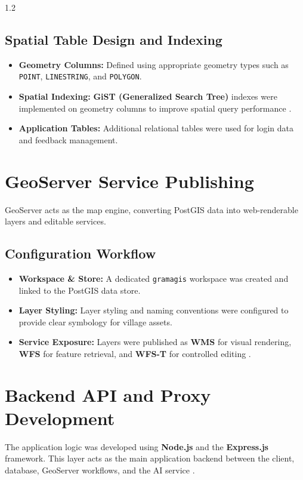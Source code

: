\begin{spacing}{1.2}
\subsection*{Spatial Table Design and Indexing}

\begin{itemize}
    \item \textbf{Geometry Columns:} Defined using appropriate geometry types such as \texttt{POINT}, \texttt{LINESTRING}, and \texttt{POLYGON}.
    \item \textbf{Spatial Indexing:} \textbf{GiST (Generalized Search Tree)} indexes were implemented on geometry columns to improve spatial query performance \cite{postgis_in_action}.
    \item \textbf{Application Tables:} Additional relational tables were used for login data and feedback management.
\end{itemize}

\section{GeoServer Service Publishing}

GeoServer acts as the map engine, converting PostGIS data into web-renderable layers and editable services.

\subsection*{Configuration Workflow}

\begin{itemize}
    \item \textbf{Workspace \& Store:} A dedicated \texttt{gramagis} workspace was created and linked to the PostGIS data store.
    \item \textbf{Layer Styling:} Layer styling and naming conventions were configured to provide clear symbology for village assets.
    \item \textbf{Service Exposure:} Layers were published as \textbf{WMS} for visual rendering, \textbf{WFS} for feature retrieval, and \textbf{WFS-T} for controlled editing \cite{fu2020webgis}.
\end{itemize}

\section{Backend API and Proxy Development}

The application logic was developed using \textbf{Node.js} and the \textbf{Express.js} framework. This layer acts as the main application backend between the client, database, GeoServer workflows, and the AI service \cite{fu2020webgis}.


\end{spacing}

